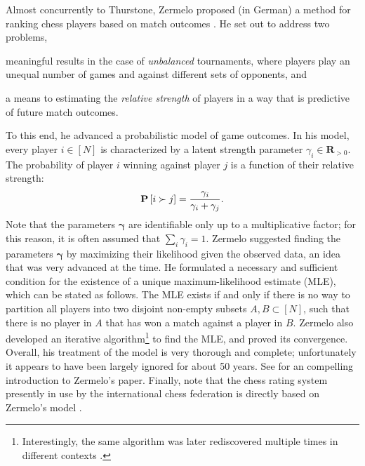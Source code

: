 Almost concurrently to Thurstone, Zermelo proposed (in German) a method for ranking chess players based on match outcomes \citep{zermelo1928berechnung}.
He set out to address two problems,
\begin{enuminline}
\item meaningful results in the case of \emph{unbalanced} tournaments, where players play an unequal number of games and against different sets of opponents, and
\item a means to estimating the \emph{relative strength} of players in a way that is predictive of future match outcomes.
\end{enuminline}
To this end, he advanced a probabilistic model of game outcomes.
In his model, every player $i \in [N]$ is characterized by a latent strength parameter $\gamma_i \in \mathbf{R}_{>0}$.
The probability of player $i$ winning against player $j$ is a function of their relative strength:
\begin{align}
\label{in:eq:zermelo}
\mathbf{P}\left[ i \succ j \right] = \frac{\gamma_i}{\gamma_i + \gamma_j}.
\end{align}
Note that the parameters $\bm{\gamma}$ are identifiable only up to a multiplicative factor;
for this reason, it is often assumed that $\sum_i \gamma_i = 1$.
Zermelo suggested finding the parameters $\bm{\gamma}$ by maximizing their likelihood given the observed data, an idea that was very advanced at the time.
He formulated a necessary and sufficient condition for the existence of a unique maximum-likelihood estimate (MLE), which can be stated as follows.
The MLE exists if and only if there is no way to partition all players into two disjoint non-empty subsets $A, B \subset [N]$, such that there is no player in $A$ that has won a match against a player in $B$.
Zermelo also developed an iterative algorithm\footnote{%
Interestingly, the same algorithm was later rediscovered multiple times in different contexts \citep{bradley1952rank, ford1957solution, dykstra1960rank, hunter2004mm, caron2012efficient}.}
to find the MLE, and proved its convergence.
Overall, his treatment of the model is very thorough and complete; unfortunately it appears to have been largely ignored for about 50 years.
See \citet{glickman2013introductory} for an compelling introduction to Zermelo's paper.
Finally, note that the chess rating system presently in use by the international chess federation is directly based on Zermelo's model \citep{elo1978rating}.

